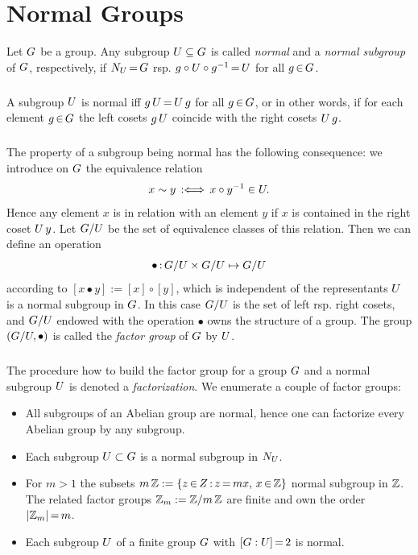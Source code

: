 \documentclass[11pt,twoside]{article}
\begin{document}
\section{Normal Groups}
Let $G$ be a group.
Any subgroup $U \subseteq G$ is called \textit{normal}
and a \textit{normal subgroup} of $G$,
respectively,
if $N_{U} {\,=\,} G$ rsp. $g \circ U \circ g^{-1} {\,=\,} U$
for all $g {\,\in\,} G$.

\subparagraph{}
A subgroup $U$ is normal iff
$g \, U {\,=\,} U \, g$ for all $g {\,\in\,} G$,
or in other words,
if for each element $g {\,\in\,} G$ the left cosets $g \, U$
coincide with the right cosets $U \, g$.

\subparagraph{}
The property of a subgroup being normal has the following consequence:
we introduce on $G$ the equivalence relation
\[
x \sim y \, :\Longleftrightarrow \, x \circ y^{-1} \in U.
\]
Hence any element $x$ is in relation with an element $y$
if $x$ is contained in the right coset $U \, y$.
Let $G/U$ be the set of equivalence classes of this relation.
Then we can define an operation
\[
\bullet {\,:\,} G / U \times G / U \mapsto G / U
\]
according to $[x \bullet y] := [x] \circ [y]$,
which is independent of the representants \iff
$U$ is a normal subgroup in $G$.
In this case $G / U$ is the set of left rsp. right cosets,
and $G / U$ endowed with the operation $\bullet$
owns the structure of a group.
The group $(G / U,\bullet)$ is called the \textit{factor group}
of $G$ by $U$.

\subparagraph{}
The procedure how to build the factor group for a group $G$
and a normal subgroup $U$ is denoted a \textit{factorization}.
We enumerate a couple of factor groups:

\begin{itemize}[leftmargin=15pt,itemsep=2pt]
\item[1.]
All subgroups of an Abelian group are normal,
hence one can factorize every Abelian group by any subgroup.

\item[2.]
Each subgroup $U \subset G$ is a normal subgroup in $N_{U}$.

\item[3.]
For $m > 1$ the subsets
$m \, {\mathbb{Z}} := \{z {\,\in\,} Z {\,:\,} z {\,=\,} mx, \, x{\,\in\,} {\mathbb{Z}} \}$ normal subgroup in ${\mathbb{Z}}$.
The related factor groups ${\mathbb{Z}}_m := {\mathbb{Z}} / m \, {\mathbb{Z}}$ are finite
and own the order $\abs{\Z_m} \eq m$.

\item[4.]
Each subgroup $U$ of a finite group $G$ with $[G:U] {\,=\,} 2$
is normal.
\end{itemize}
\end{document}
